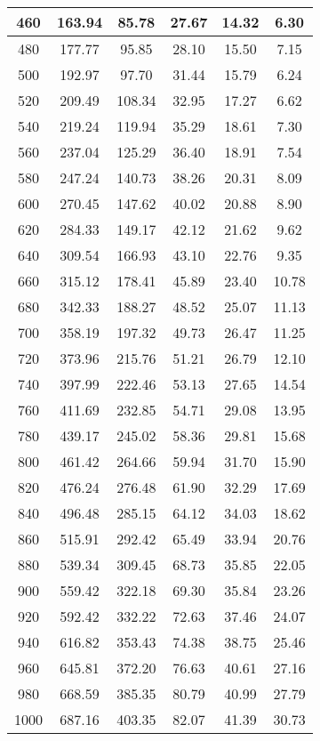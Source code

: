\documentclass[10pt,a4paper]{report}
\begin{document}
\begin{samepage}
\begin{table}[H]
\begin{center}
\begin{tabular}{|c|c|c|c|c|c|}
\hline
460 & 163.94 & 85.78 & 27.67 & 14.32 & 6.30 \\
\hline
480 & 177.77 & 95.85 & 28.10 & 15.50 & 7.15 \\
\hline
500 & 192.97 & 97.70 & 31.44 & 15.79 & 6.24 \\
\hline
520 & 209.49 & 108.34 & 32.95 & 17.27 & 6.62 \\
\hline
540 & 219.24 & 119.94 & 35.29 & 18.61 & 7.30 \\
\hline
560 & 237.04 & 125.29 & 36.40 & 18.91 & 7.54 \\
\hline
580 & 247.24 & 140.73 & 38.26 & 20.31 & 8.09 \\
\hline
600 & 270.45 & 147.62 & 40.02 & 20.88 & 8.90 \\
\hline
620 & 284.33 & 149.17 & 42.12 & 21.62 & 9.62 \\
\hline
640 & 309.54 & 166.93 & 43.10 & 22.76 & 9.35 \\
\hline
660 & 315.12 & 178.41 & 45.89 & 23.40 & 10.78 \\
\hline
680 & 342.33 & 188.27 & 48.52 & 25.07 & 11.13 \\
\hline
700 & 358.19 & 197.32 & 49.73 & 26.47 & 11.25 \\
\hline
720 & 373.96 & 215.76 & 51.21 & 26.79 & 12.10 \\
\hline
740 & 397.99 & 222.46 & 53.13 & 27.65 & 14.54 \\
\hline
760 & 411.69 & 232.85 & 54.71 & 29.08 & 13.95 \\
\hline
780 & 439.17 & 245.02 & 58.36 & 29.81 & 15.68 \\
\hline
800 & 461.42 & 264.66 & 59.94 & 31.70 & 15.90 \\
\hline
820 & 476.24 & 276.48 & 61.90 & 32.29 & 17.69 \\
\hline
840 & 496.48 & 285.15 & 64.12 & 34.03 & 18.62 \\
\hline
860 & 515.91 & 292.42 & 65.49 & 33.94 & 20.76 \\
\hline
880 & 539.34 & 309.45 & 68.73 & 35.85 & 22.05 \\
\hline
900 & 559.42 & 322.18 & 69.30 & 35.84 & 23.26 \\
\hline
920 & 592.42 & 332.22 & 72.63 & 37.46 & 24.07 \\
\hline
940 & 616.82 & 353.43 & 74.38 & 38.75 & 25.46 \\
\hline
960 & 645.81 & 372.20 & 76.63 & 40.61 & 27.16 \\
\hline
980 & 668.59 & 385.35 & 80.79 & 40.99 & 27.79 \\
\hline
1000 & 687.16 & 403.35 & 82.07 & 41.39 & 30.73 \\
\hline 
\end{tabular} 
\end{center}
\end{table}
\end{samepage}
\end{document}
